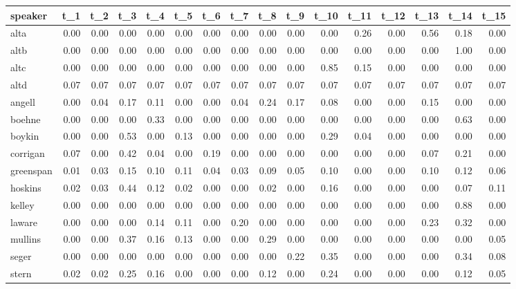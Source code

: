 \begin{tabular}{lrrrrrrrrrrrrrrr}
\toprule
   speaker &  t\_1 &  t\_2 &  t\_3 &  t\_4 &  t\_5 &  t\_6 &  t\_7 &  t\_8 &  t\_9 &  t\_10 &  t\_11 &  t\_12 &  t\_13 &  t\_14 &  t\_15 \\
\midrule
      alta & 0.00 & 0.00 & 0.00 & 0.00 & 0.00 & 0.00 & 0.00 & 0.00 & 0.00 &  0.00 &  0.26 &  0.00 &  0.56 &  0.18 &  0.00 \\
      altb & 0.00 & 0.00 & 0.00 & 0.00 & 0.00 & 0.00 & 0.00 & 0.00 & 0.00 &  0.00 &  0.00 &  0.00 &  0.00 &  1.00 &  0.00 \\
      altc & 0.00 & 0.00 & 0.00 & 0.00 & 0.00 & 0.00 & 0.00 & 0.00 & 0.00 &  0.85 &  0.15 &  0.00 &  0.00 &  0.00 &  0.00 \\
      altd & 0.07 & 0.07 & 0.07 & 0.07 & 0.07 & 0.07 & 0.07 & 0.07 & 0.07 &  0.07 &  0.07 &  0.07 &  0.07 &  0.07 &  0.07 \\
    angell & 0.00 & 0.04 & 0.17 & 0.11 & 0.00 & 0.00 & 0.04 & 0.24 & 0.17 &  0.08 &  0.00 &  0.00 &  0.15 &  0.00 &  0.00 \\
    boehne & 0.00 & 0.00 & 0.00 & 0.33 & 0.00 & 0.00 & 0.00 & 0.00 & 0.00 &  0.00 &  0.00 &  0.00 &  0.00 &  0.63 &  0.00 \\
    boykin & 0.00 & 0.00 & 0.53 & 0.00 & 0.13 & 0.00 & 0.00 & 0.00 & 0.00 &  0.29 &  0.04 &  0.00 &  0.00 &  0.00 &  0.00 \\
  corrigan & 0.07 & 0.00 & 0.42 & 0.04 & 0.00 & 0.19 & 0.00 & 0.00 & 0.00 &  0.00 &  0.00 &  0.00 &  0.07 &  0.21 &  0.00 \\
 greenspan & 0.01 & 0.03 & 0.15 & 0.10 & 0.11 & 0.04 & 0.03 & 0.09 & 0.05 &  0.10 &  0.00 &  0.00 &  0.10 &  0.12 &  0.06 \\
   hoskins & 0.02 & 0.03 & 0.44 & 0.12 & 0.02 & 0.00 & 0.00 & 0.02 & 0.00 &  0.16 &  0.00 &  0.00 &  0.00 &  0.07 &  0.11 \\
    kelley & 0.00 & 0.00 & 0.00 & 0.00 & 0.00 & 0.00 & 0.00 & 0.00 & 0.00 &  0.00 &  0.00 &  0.00 &  0.00 &  0.88 &  0.00 \\
    laware & 0.00 & 0.00 & 0.00 & 0.14 & 0.11 & 0.00 & 0.20 & 0.00 & 0.00 &  0.00 &  0.00 &  0.00 &  0.23 &  0.32 &  0.00 \\
   mullins & 0.00 & 0.00 & 0.37 & 0.16 & 0.13 & 0.00 & 0.00 & 0.29 & 0.00 &  0.00 &  0.00 &  0.00 &  0.00 &  0.00 &  0.05 \\
     seger & 0.00 & 0.00 & 0.00 & 0.00 & 0.00 & 0.00 & 0.00 & 0.00 & 0.22 &  0.35 &  0.00 &  0.00 &  0.00 &  0.34 &  0.08 \\
     stern & 0.02 & 0.02 & 0.25 & 0.16 & 0.00 & 0.00 & 0.00 & 0.12 & 0.00 &  0.24 &  0.00 &  0.00 &  0.00 &  0.12 &  0.05 \\
\bottomrule
\end{tabular}
